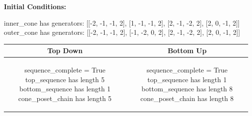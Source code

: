 \documentclass[10pt]{article}
\begin{document}
\textbf{Initial Conditions:}
\begin{SAGE}
inner_cone has generators: 
[[-2, -1, -1, 2], [1, -1, -1, 2], [2, -1, -2, 2], [2, 0, -1, 2]]
outer_cone has generators: 
[[-2, -1, -1, 2], [-1, -2, 0, 2], [2, -1, -2, 2], [2, 0, -1, 2]]

\end{SAGE}
\begin{tabular}{c|c}
\textbf{Top Down} & \textbf{Bottom Up} \\ \hline  
\begin{SAGE}
sequence_complete = True
top_sequence has length 5
bottom_sequence has length 1
cone_poset_chain has length 5
\end{SAGE} 
&
\begin{SAGE}
sequence_complete = True
top_sequence has length 1
bottom_sequence has length 8
cone_poset_chain has length 8
\end{SAGE} 
\\ \hline


\end{tabular}
\end{document}
